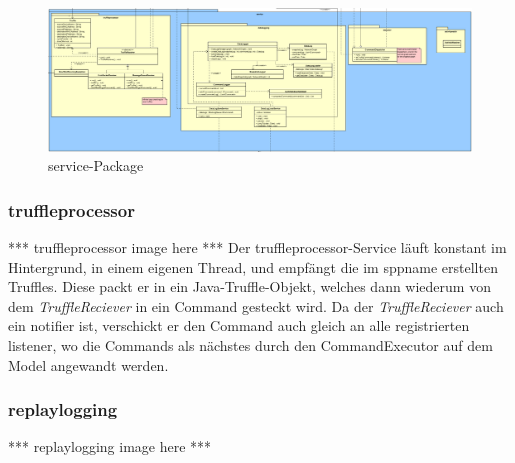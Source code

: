 \begin{figure}[H]
  \centering
  \includegraphics[width=\textwidth]{../diagramimages/service.png}
  \caption{service-Package}
  \medskip
\end{figure}

    \subsubsection{truffleprocessor}
    \label{subsubsec:truffleprocessor}

    *** truffleprocessor image here ***
    \newline
    \newline
    Der truffleprocessor-Service läuft konstant im Hintergrund, in einem eigenen Thread,
    und empfängt die im \gls{sppname} erstellten Truffles.
    Diese packt er in ein Java-Truffle-Objekt, welches dann wiederum von dem
    \textit{TruffleReciever} in ein Command gesteckt wird. Da der \textit{TruffleReciever}
    auch ein \gls{notifier} ist, verschickt er den Command auch gleich an
    alle registrierten \gls{listener}, wo die Commands als nächstes durch den
    CommandExecutor auf dem Model angewandt werden.

    \subsubsection{replaylogging}
    \label{subsubsec:replaylogging}

    *** replaylogging image here ***
    \newline
    \newline

